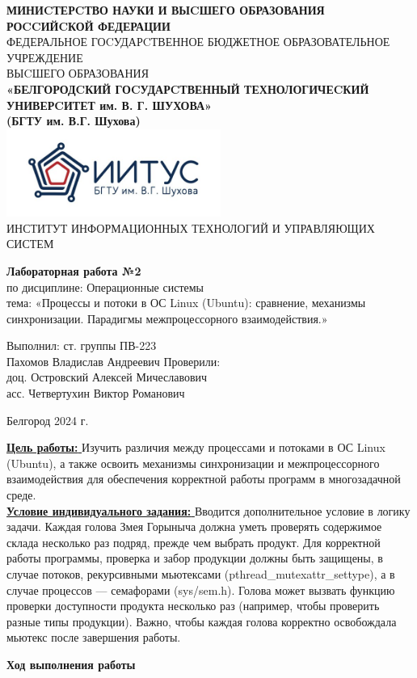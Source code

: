 \documentclass[a4paper,14pt]{extarticle}
\newcommand\textbox[1]{
	\parbox{.45\textwidth}{#1}
}
\begin{document}
\begin{center}
    \small{
        \textbf{МИНИCТЕРCТВО НАУКИ И ВЫCШЕГО ОБРАЗОВАНИЯ РОCCИЙCКОЙ ФЕДЕРАЦИИ}\\
        ФЕДЕРАЛЬНОЕ ГОCУДАРCТВЕННОЕ БЮДЖЕТНОЕ ОБРАЗОВАТЕЛЬНОЕ УЧРЕЖДЕНИЕ\\ВЫCШЕГО ОБРАЗОВАНИЯ \\
        \textbf{«БЕЛГОРОДCКИЙ ГОCУДАРCТВЕННЫЙ ТЕХНОЛОГИЧЕCКИЙ\\УНИВЕРCИТЕТ им. В. Г. ШУХОВА»\\ (БГТУ им. В.Г. Шухова)} \\
        \bigbreak
        \includegraphics[width=70mm]{log}\\
        ИНСТИТУТ ИНФОРМАЦИОННЫХ ТЕХНОЛОГИЙ И УПРАВЛЯЮЩИХ СИСТЕМ\\}
\end{center}

\vfill
\begin{center}
    \large{
        \textbf{
            Лабораторная работа №2}}\\
    \normalsize{
        по дисциплине: Операционные системы \\
        тема: «Процессы и потоки в ОС Linux (Ubuntu): сравнение, механизмы синхронизации. Парадигмы межпроцессорного взаимодействия.»}
\end{center}
\vfill
\hfill\textbox{
    Выполнил: ст. группы ПВ-223\\Пахомов Владислав Андреевич
    \bigbreak
    Проверили: \\доц. Островский Алексей Мичеславович\\
    асс. Четвертухин Виктор Романович
}
\vfill\begin{center}
    Белгород 2024 г.
\end{center}
\newpage
\underline{\textbf{Цель работы: }}Изучить различия между процессами и потоками в ОС Linux (Ubuntu), а также
освоить механизмы синхронизации и межпроцессорного взаимодействия для обеспечения
корректной работы программ в многозадачной среде.\\
\underline{\textbf{Условие индивидуального задания: }}Вводится дополнительное условие в логику задачи. Каждая голова Змея Горыныча должна
уметь проверять содержимое склада несколько раз подряд, прежде чем выбрать продукт. Для
корректной работы программы, проверка и забор продукции должны быть защищены, в случае
потоков, рекурсивными мьютексами (pthread\_mutexattr\_settype), а в случае процессов —
семафорами (sys/sem.h). Голова может вызвать функцию проверки доступности продукта
несколько раз (например, чтобы проверить разные типы продукции). Важно, чтобы каждая
голова корректно освобождала мьютекс после завершения работы.\\
\begin{center}
\textbf{Ход выполнения работы}
\end{center}
\end{document}
